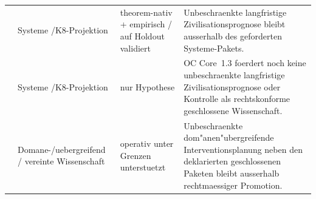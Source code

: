 \begin{longtable}{@{}L{0.15\textwidth}L{0.12\textwidth}L{0.13\textwidth}L{0.50\textwidth}@{}}
 & Systeme /\allowbreak K8-Projektion & theorem-nativ + empirisch / auf Holdout validiert & Unbeschraenkte langfristige Zivilisationsprognose bleibt ausserhalb des geforderten Systeme-Pakets. \\
 & Systeme /\allowbreak K8-Projektion & nur Hypothese & OC Core~1.3 foerdert noch keine unbeschraenkte langfristige Zivilisationsprognose oder Kontrolle als rechtskonforme geschlossene Wissenschaft. \\
 & Domane-/\allowbreak uebergreifend / vereinte Wissenschaft & operativ unter Grenzen unterstuetzt & Unbeschraenkte dom"anen"ubergreifende Interventionsplanung neben den deklarierten geschlossenen Paketen bleibt ausserhalb rechtmaessiger Promotion. \\
\bottomrule
\end{longtable}

